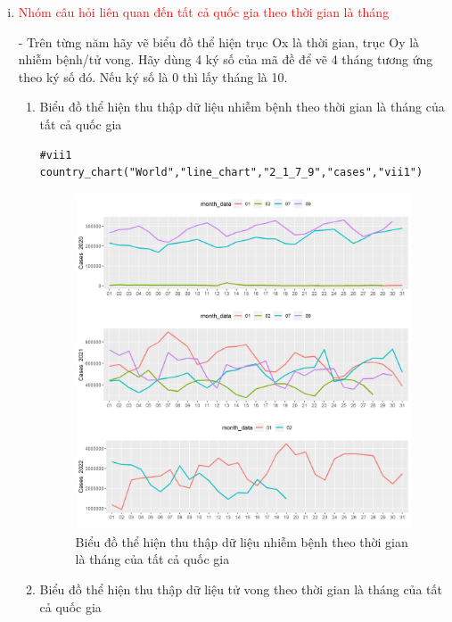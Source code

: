 \documentclass[a4paper]{article}
\theoremstyle{definition}
\begin{document}
\begin{enumerate}[i)]
\item \textcolor{red}{Nhóm câu hỏi liên quan đến tất cả quốc gia theo thời gian là tháng }

- Trên từng năm hãy vẽ biểu đồ thể hiện trục Ox là thời gian, trục Oy là nhiễm bệnh/tử vong. Hãy dùng 4 ký số của mã đề để vẽ 4 tháng tương ứng theo ký số đó. Nếu ký số là 0 thì lấy tháng là 10. 
\begin{enumerate}[1)]

    \item Biểu đồ thể hiện thu thập dữ liệu nhiễm bệnh theo thời gian là tháng của tất cả quốc gia
\begin{lstlisting}[frame=single]  
#vii1
country_chart("World","line_chart","2_1_7_9","cases","vii1")
		\end{lstlisting}	
        \begin{figure}[htp]
		    \centering
		    \includegraphics[scale = 0.7]{Images/VII/vii1 World .jpeg} 
		    \caption{Biểu đồ thể hiện thu thập dữ liệu nhiễm bệnh theo thời gian là tháng của tất cả quốc gia}
		    \label{fig:my_label}
		\end{figure}
		\newpage
    \item Biểu đồ thể hiện thu thập dữ liệu tử vong theo thời gian là tháng của tất cả quốc gia
    \begin{lstlisting}[frame=single]  

\end{lstlisting}
\end{enumerate}
\end{enumerate}
\end{document}
